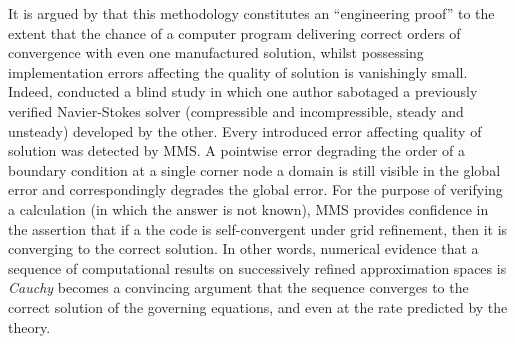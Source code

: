 It is argued by \cite{roache2002cvm} that this methodology constitutes an ``engineering proof'' to the extent that the chance of a computer program delivering correct orders of convergence with even one manufactured solution, whilst possessing implementation errors affecting the quality of solution is vanishingly small.
Indeed, \cite{knupp2002verification} conducted a blind study in which one author sabotaged a previously verified Navier-Stokes solver (compressible and incompressible, steady and unsteady) developed by the other.
Every introduced error affecting quality of solution was detected by MMS.
A pointwise error degrading the order of a boundary condition at a single corner node a domain is still visible in the global error and correspondingly degrades the global error.
For the purpose of verifying a calculation (in which the answer is not known), MMS provides confidence in the assertion that if a the code is self-convergent under grid refinement, then it is converging to the correct solution.
In other words, numerical evidence that a sequence of computational results on successively refined approximation spaces is \emph{Cauchy} becomes a convincing argument that the sequence converges to the correct solution of the governing equations, and even at the rate predicted by the theory.


